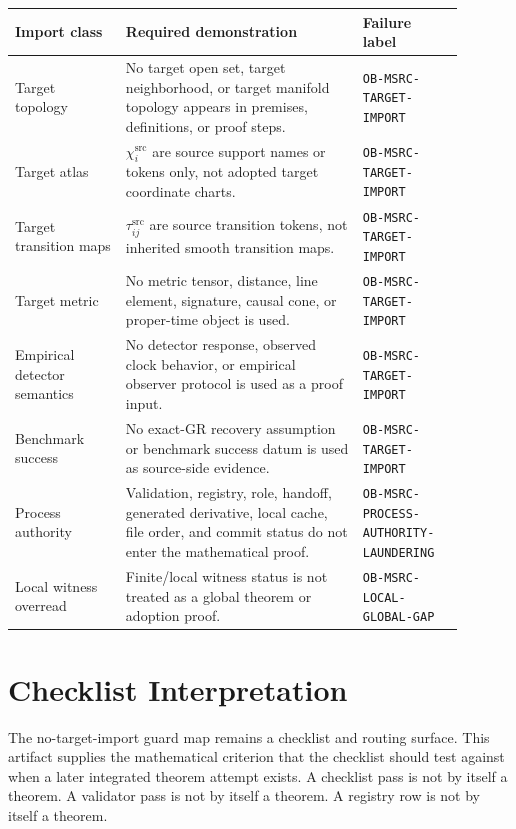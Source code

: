 \documentclass[11pt]{article}
\begin{document}
\begin{longtable}{|p{0.22\linewidth}|p{0.47\linewidth}|p{0.20\linewidth}|}
\hline
\textbf{Import class} & \textbf{Required demonstration} & \textbf{Failure label} \\
\hline
Target topology & No target open set, target neighborhood, or target manifold topology appears in premises, definitions, or proof steps. & \texttt{OB-MSRC-TARGET-IMPORT} \\
\hline
Target atlas & \(\chi_i^{\mathrm{src}}\) are source support names or tokens only, not adopted target coordinate charts. & \texttt{OB-MSRC-TARGET-IMPORT} \\
\hline
Target transition maps & \(\tau_{ij}^{\mathrm{src}}\) are source transition tokens, not inherited smooth transition maps. & \texttt{OB-MSRC-TARGET-IMPORT} \\
\hline
Target metric & No metric tensor, distance, line element, signature, causal cone, or proper-time object is used. & \texttt{OB-MSRC-TARGET-IMPORT} \\
\hline
Empirical detector semantics & No detector response, observed clock behavior, or empirical observer protocol is used as a proof input. & \texttt{OB-MSRC-TARGET-IMPORT} \\
\hline
Benchmark success & No exact-GR recovery assumption or benchmark success datum is used as source-side evidence. & \texttt{OB-MSRC-TARGET-IMPORT} \\
\hline
Process authority & Validation, registry, role, handoff, generated derivative, local cache, file order, and commit status do not enter the mathematical proof. & \texttt{OB-MSRC-PROCESS-AUTHORITY-LAUNDERING} \\
\hline
Local witness overread & Finite/local witness status is not treated as a global theorem or adoption proof. & \texttt{OB-MSRC-LOCAL-GLOBAL-GAP} \\
\hline
\end{longtable}

\section{Checklist Interpretation}

The no-target-import guard map remains a checklist and routing surface. This
artifact supplies the mathematical criterion that the checklist should test
against when a later integrated theorem attempt exists. A checklist pass is
not by itself a theorem. A validator pass is not by itself a theorem. A
registry row is not by itself a theorem.
\end{document}
